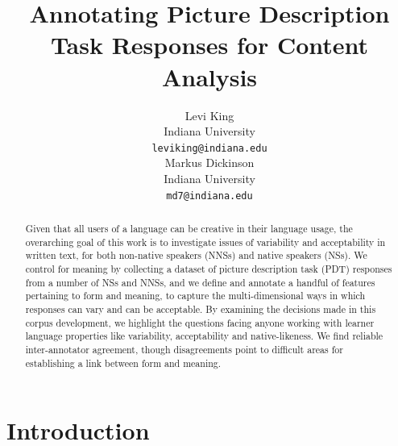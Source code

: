\documentclass[11pt,a4paper]{article}
\title{Annotating Picture Description Task Responses for Content Analysis}
\author{Levi King \\
  Indiana University \\
  {\tt leviking@indiana.edu} \\\And
  Markus Dickinson \\
  Indiana University \\
  {\tt md7@indiana.edu} \\}
\date{}
\begin{document}
\maketitle
\begin{abstract}
Given that all users of a language can be creative in their language usage, the overarching goal of this work is to investigate issues of variability and acceptability in written text, for both non-native speakers (NNSs) and native speakers (NSs).  We control for meaning by collecting a dataset of picture description task (PDT) responses from a number of NSs and NNSs, and we define and annotate a handful of features pertaining to form and meaning, to capture the multi-dimensional ways in which responses can vary and can be acceptable.  By examining the decisions made in this corpus development, we highlight the questions facing anyone working with learner language properties like variability, acceptability and native-likeness.  We find reliable inter-annotator agreement, though disagreements point to difficult areas for establishing a link between form and meaning.
\end{abstract}

\section{Introduction}



\end{document}
